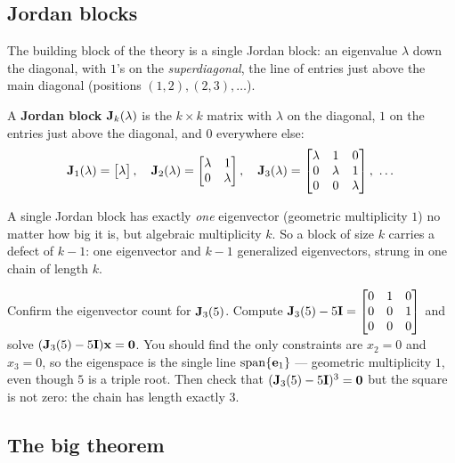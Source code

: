 \subsection{Jordan blocks}

The building block of the theory is a single Jordan block: an eigenvalue $\lambda$ down the
diagonal, with $1$'s on the \emph{superdiagonal}, the line of entries just above the
main diagonal (positions $(1,2),(2,3),\dots$).

\begin{definition}
\label{ch28:def-block}
A \textbf{Jordan block} $\mathbf{J}_k(\lambda)$ is the $k\times k$ matrix with $\lambda$ on
the diagonal, $1$ on the entries just above the diagonal, and $0$ everywhere else:
\[
\mat{J}_1(\lambda)=\begin{bmatrix}\lambda\end{bmatrix},\quad
\mat{J}_2(\lambda)=\begin{bmatrix}\lambda&1\\0&\lambda\end{bmatrix},\quad
\mat{J}_3(\lambda)=\begin{bmatrix}\lambda&1&0\\0&\lambda&1\\0&0&\lambda\end{bmatrix},\ \dots
\]
\end{definition}

A single Jordan block has exactly \emph{one} eigenvector (geometric multiplicity $1$) no
matter how big it is, but algebraic multiplicity $k$. So a block of size $k$ carries a
defect of $k-1$: one eigenvector and $k-1$ generalized eigenvectors, strung in one chain
of length $k$.

\begin{labbox}
Confirm the eigenvector count for $\mathbf{J}_3(5)$. Compute
$\mathbf{J}_3(5)-5\mathbf{I}=\begin{bmatrix}0&1&0\\0&0&1\\0&0&0\end{bmatrix}$ and solve
$(\mathbf{J}_3(5)-5\mathbf{I})\mathbf{x}=\mathbf{0}$. You should find the only constraints are
$x_2=0$ and $x_3=0$, so the eigenspace is the single line $\operatorname{span}\{\mathbf{e}_1\}$ ---
geometric multiplicity $1$, even though $5$ is a triple root. Then check that
$(\mathbf{J}_3(5)-5\mathbf{I})^3=\mathbf{0}$ but the square is not zero: the chain has length
exactly $3$.
\end{labbox}

\subsection{The big theorem}

